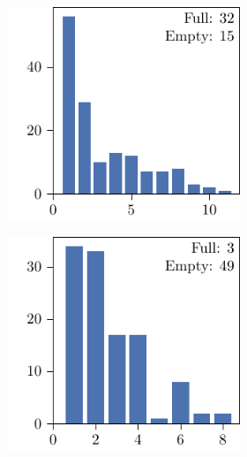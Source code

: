 \begin{figure}[p]
\begin{subfigure}{\textwidth}
\begin{subfigure}{\mymultiouter}
    \end{subfigure}
  \end{subfigure}
  \centering
  \begin{subfigure}{\textwidth}
    \centering
    \begin{subfigure}{\mymultiouter}
        \centering
          \includegraphics[width=\mymultiinner]{figures/new/relaxed_common-princess-qlibra-permutation}
    \end{subfigure}
    \begin{subfigure}{\mymultiouter}
        \centering
          \includegraphics[width=\mymultiinner]{figures/new/relaxed_common-princess-qlibra-retraining}
    \end{subfigure}
    \begin{subfigure}{\mymultiouter}
        \centering

\end{subfigure}
\end{subfigure}
\end{figure}
